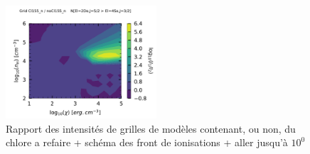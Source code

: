 \begin{figure}[!htbp]
    \centering \includegraphics[trim = {0 0 0 1cm},clip,width=0.5\textwidth]{figure/Cl/gridModelEmiss/map_Cl155_n_noCl155_nI_N.pdf}
    \caption{Rapport des intensités de grilles de modèles contenant, ou non, du chlore a refaire + schéma des front de ionisations + aller jusqu'à $10^0$}
    \label{fig:Cl:gridModelEmiss:N}
\end{figure}










